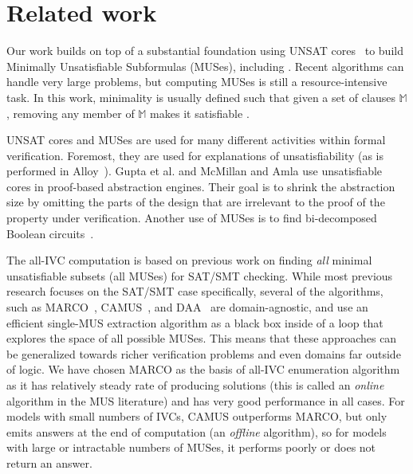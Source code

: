 \section{Related work}
\label{sec:related}

Our work builds on top of a substantial foundation using UNSAT cores~\cite{Cimatti2007:UNSAT} to build Minimally Unsatisfiable Subformulas
(MUSes), including \cite{nadel2014accelerated, belov2013core, belov2012towards, ryvchin2011faster, belov2012computing, marques2010minimal}.  Recent algorithms can handle very large problems, but computing MUSes is still a resource-intensive task.  In this work, minimality is usually defined such that given a set of clauses $\mathbb{M}$, removing any member of $\mathbb{M}$ makes it satisfiable \cite{belov2012computing}.

UNSAT cores and MUSes are used for many different activities within
formal verification.  Foremost, they are used for explanations of unsatisfiability (as is performed in Alloy~\cite{Torlak08:cores}).  Gupta et al. \cite{gupta2003iterative} and
McMillan and Amla \cite{mcmillan2003automatic} use 
unsatisfiable cores in proof-based abstraction engines. Their goal is
to shrink the abstraction size by omitting the parts of the design
that are irrelevant to the proof of the property under verification.  Another use of MUSes is to find bi-decomposed Boolean circuits~\cite{6081636}.

The all-IVC computation is based on previous work on finding {\em all} minimal unsatisfiable subsets (all MUSes) for SAT/SMT checking.  While most previous research focuses on the SAT/SMT case specifically, several of the algorithms, such as MARCO~\cite{marco2016fast}, CAMUS~\cite{Liffiton2008}, and DAA~\cite{Bailey:2005:DMU:2158261.2158277} are domain-agnostic, and use an efficient single-MUS extraction algorithm as a black box inside of a loop that explores the space of all possible MUSes.  This means that these approaches can be generalized towards richer verification problems and even domains far outside of logic.  We have chosen MARCO as the basis of all-IVC enumeration algorithm as it has relatively steady rate of producing solutions (this is called an {\em online} algorithm in the MUS literature) and has very good performance in all cases.  For models with small numbers of IVCs, CAMUS outperforms MARCO, but only emits answers at the end of computation (an {\em offline} algorithm), so for models with large or intractable numbers of MUSes, it performs poorly or does not return an answer.

